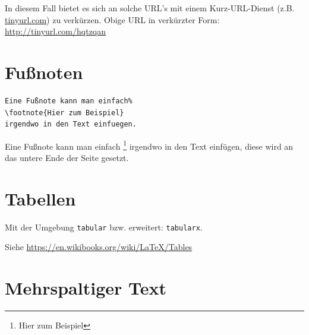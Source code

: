 In diesem Fall bietet es sich an solche URL's mit einem Kurz-URL-Dienst (z.B. \url{tinyurl.com}) zu verkürzen. 
Obige URL in verkürzter Form: \url{http://tinyurl.com/hqtzqan}


\section{Fußnoten}

\begin{Verbatim}[frame=single]
Eine Fußnote kann man einfach%
\footnote{Hier zum Beispiel}
irgendwo in den Text einfuegen.
\end{Verbatim}

Eine Fußnote kann man einfach%
\footnote{Hier zum Beispiel}
irgendwo in den Text einfügen, diese wird an das untere Ende der Seite gesetzt.


\section{Tabellen}

Mit der Umgebung \lstinline{tabular} bzw. erweitert: \lstinline{tabularx}.

Siehe \url{https://en.wikibooks.org/wiki/LaTeX/Tables}


\section{Mehrspaltiger Text}

